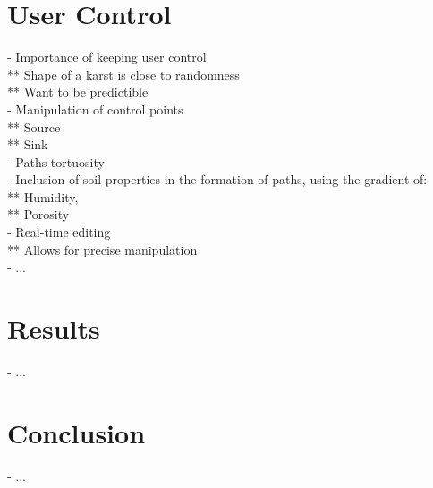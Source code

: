 \section{User Control}
\label{sec:karsts_user-control}
- Importance of keeping user control \\
** Shape of a karst is close to randomness \\
** Want to be predictible \\
- Manipulation of control points \\
** Source \\
** Sink \\
- Paths tortuosity \\
- Inclusion of soil properties in the formation of paths, using the gradient of: \\
** Humidity, \\
** Porosity \\
- Real-time editing \\
** Allows for precise manipulation \\
- ...

\section{Results}
\label{sec:karsts_results}
- ... 

\section{Conclusion}
\label{sec:karsts_conclusion}
- ...